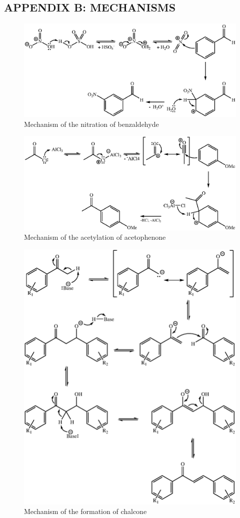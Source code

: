 \documentclass[11pt]{article}
\begin{document}
\subsection*{APPENDIX B: MECHANISMS}
\begin{figure}[ht]
    \centering
    \includegraphics[scale=0.8]{mechanisms/nitration.eps}
    \caption{Mechanism of the nitration of benzaldehyde}
\end{figure}
\vspace{15mm}
\begin{figure}[h!]
    \centering
    \includegraphics[scale=0.8]{mechanisms/acetylation.eps}
    \caption{Mechanism of the acetylation of acetophenone}
\end{figure}
\begin{figure}[H]
    \centering
    \includegraphics[scale=0.8]{mechanisms/chalcone.eps}
    \caption{Mechanism of the formation of chalcone}
\end{figure}
\end{document}
